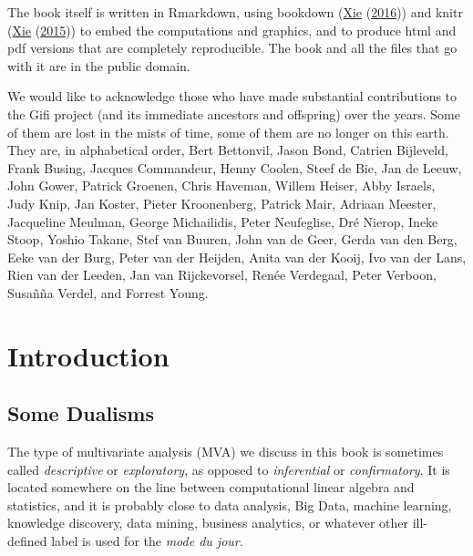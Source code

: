 \documentclass[
  12pt,
]{book}
\begin{document}
The book itself is written in Rmarkdown, using bookdown (\protect\hyperlink{ref-xie_16}{Xie} (\protect\hyperlink{ref-xie_16}{2016})) and knitr (\protect\hyperlink{ref-xie_15}{Xie} (\protect\hyperlink{ref-xie_15}{2015})) to embed the computations and graphics, and to produce html and pdf versions that are completely reproducible. The book and all the files that go with it are in the public domain.

We would like to acknowledge those who have made substantial contributions to the Gifi project (and its immediate ancestors and offspring) over the years. Some of them are lost in the mists of time, some of them are no longer on this earth. They are, in alphabetical order, Bert Bettonvil, Jason Bond, Catrien Bijleveld, Frank Busing, Jacques Commandeur, Henny Coolen, Steef de Bie, Jan de Leeuw, John Gower, Patrick Groenen, Chris Haveman, Willem Heiser, Abby Israels, Judy Knip, Jan Koster, Pieter Kroonenberg, Patrick Mair, Adriaan Meester, Jacqueline Meulman, George Michailidis, Peter Neufeglise, Dré Nierop, Ineke Stoop, Yoshio Takane, Stef van Buuren, John van de Geer, Gerda van den Berg, Eeke van der Burg, Peter van der Heijden, Anita van der Kooij, Ivo van der Lans, Rien van der Leeden, Jan van Rijckevorsel, Renée Verdegaal, Peter Verboon, Susañña Verdel, and Forrest Young.

\hypertarget{introduction}{%
\chapter{Introduction}\label{introduction}}

\hypertarget{some-dualisms}{%
\section{Some Dualisms}\label{some-dualisms}}

The type of multivariate analysis (MVA) we discuss in this book is sometimes called \emph{descriptive} or \emph{exploratory}, as opposed to \emph{inferential} or \emph{confirmatory}. It is located somewhere on the line between computational linear algebra and statistics, and it is probably close to data analysis, Big Data, machine learning, knowledge discovery, data mining, business analytics, or whatever other ill-defined label is used for the \emph{mode du jour}.
\end{document}
